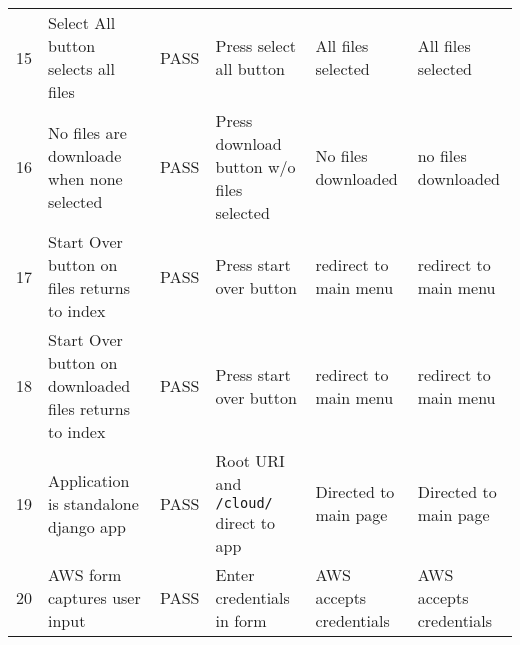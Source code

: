 \documentclass{article}
\begin{document}
\begin{landscape}
\begin{center}
\begin{tabular}{|l|l|l|l|l|l|}
      15 & Select All button selects all files & PASS & Press select all button & All files selected & All files selected \\
      16 & No files are downloade when none selected & PASS & Press download button w/o files selected & No files downloaded & no files downloaded \\
      17 & Start Over button on files returns to index & PASS & Press start over button & redirect to main menu & redirect to main menu \\
      18 & Start Over button on downloaded files returns to index & PASS & Press start over button & redirect to main menu & redirect to main menu \\
      19 & Application is standalone django app & PASS & Root URI and \texttt{/cloud/} direct to app & Directed to main page & Directed to main page \\
      20 & AWS form captures user input & PASS & Enter credentials in form & AWS accepts credentials & AWS accepts credentials \\
      \hline

      \hline
    \end{tabular}
    \end{center}
    \end{landscape}
\end{document}
